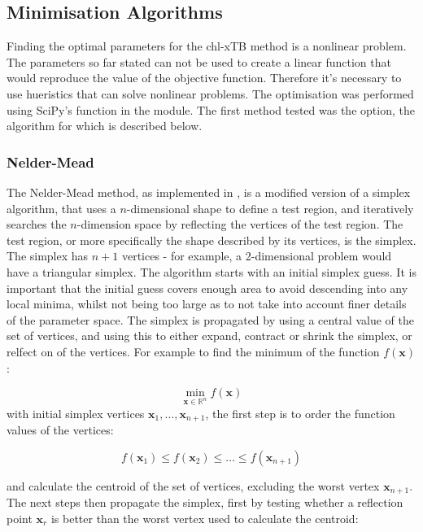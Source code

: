 \subsection{Minimisation Algorithms}
\label{subsec:algorithms}
Finding the optimal parameters for the chl-xTB method is a nonlinear problem. The
parameters so far stated can not be used to create a linear function that would
reproduce the value of the objective function. Therefore it's necessary to use
hueristics that can solve nonlinear problems. 
The optimisation was performed using SciPy's  function in the 
 module. The first method tested was the  option,
the algorithm for which is described below.

\subsubsection{Nelder-Mead}
\label{nelder_mead}
The Nelder-Mead method, as implemented in , is a modified version of a simplex
algorithm, that uses a $n$-dimensional shape to define a test region, and iteratively
searches the $n$-dimension space by reflecting the vertices of the test region. 
The test region, or more specifically the shape described by its vertices, is the
simplex. The simplex has $n+1$ vertices - for example, a 2-dimensional problem
would have a triangular simplex.
The algorithm starts with an initial simplex guess. It is important that the initial
guess covers enough area to avoid descending into any local minima, whilst not being
too large as to not take into account finer details of the parameter space.
The simplex is propagated by using a central value of the set of vertices, and using
this to either expand, contract or shrink the simplex, or relfect on of the vertices.
For example to find the minimum of the function $f\left(\mathbf{x}\right)$:

\begin{equation}
\min_{\mathbf{x} \in \mathbb{R}^n} f\left( \mathbf{x} \right)
\end{equation}
with initial simplex vertices $\mathbf{x}_1, \dots, \mathbf{x}_{n+1}$,
the first step is to order the function values of the vertices:

\begin{equation}
f\left(\mathbf{x}_1\right) \leq f\left(\mathbf{x}_2\right) \leq \dots \leq f\left(\mathbf{x}_{n+1}\right)
\end{equation}

and calculate the centroid of the set of vertices, excluding the worst vertex 
$\mathbf{x}_{n+1}$. The next steps then propagate the simplex, first by testing 
whether a reflection point $\mathbf{x}_r$ is better than the worst vertex used to
calculate the centroid:

